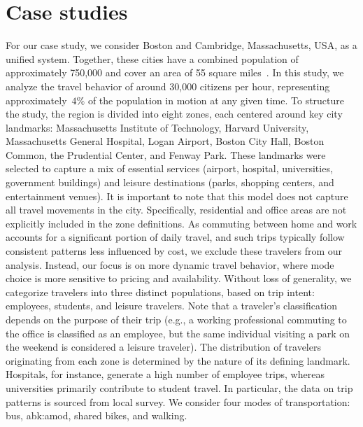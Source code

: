 \section{Case studies}
\label{sec:results}
For our case study, we consider Boston and Cambridge, Massachusetts, USA, as a unified system. Together, these cities have a combined population of approximately 750,000 and cover an area of 55 square miles~\cite{area_bos,area_cam}. 
In this study, we analyze the travel behavior of around 30,000 citizens per hour, representing approximately~$4\%$ of the population in motion at any given time. 
%
To structure the study, the region is divided into eight zones, each centered around key city landmarks: Massachusetts Institute of Technology, Harvard University, Massachusetts General Hospital, Logan Airport, Boston City Hall, Boston Common, the Prudential Center, and Fenway Park. 
These landmarks were selected to capture a mix of essential services (airport, hospital, universities, government buildings) and leisure destinations (parks, shopping centers, and entertainment venues).
%
It is important to note that this model does not capture all travel movements in the city.
Specifically, residential and office areas are not explicitly included in the zone definitions.
As commuting between home and work accounts for a significant portion of daily travel, and such trips typically follow consistent patterns less influenced by cost, we exclude these travelers from our analysis. 
Instead, our focus is on more dynamic travel behavior, where mode choice is more sensitive to pricing and availability.
%
\noindent Without loss of generality, we categorize travelers into three distinct populations, based on trip intent: employees, students, and leisure travelers. 
Note that a traveler's classification depends on the purpose of their trip (e.g., a working professional commuting to the office is classified as an employee, but the same individual visiting a park on the weekend is considered a leisure traveler).
The distribution of travelers originating from each zone is determined by the nature of its defining landmark.
Hospitals, for instance, generate a high number of employee trips, whereas universities primarily contribute to student travel.
In particular, the data on trip patterns is sourced from local survey.
We consider four modes of transportation: bus, \gls{abk:amod}, shared bikes, and walking. 

